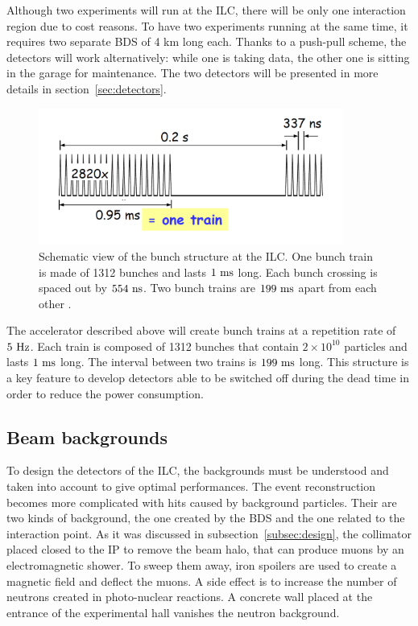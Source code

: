     Although two experiments will run at the \gls{ILC}, there will be only one interaction region due to cost reasons.
    To have two experiments running at the same time, it requires two separate \gls{BDS} of 4 km long each.
    Thanks to a push-pull scheme, the detectors will work alternatively: while one is taking data, the other one is sitting in the garage for maintenance.
    The two detectors will be presented in more details in section~\ref{sec:detectors}.
    
    \begin{figure}[!h]
      \centering
      \includegraphics[width = 10cm]{Pictures/ILC/bunch.png}
      \caption{Schematic view of the bunch structure at the ILC. One bunch train is made of 1312 bunches and lasts $1~\rm{ms}$ long. Each bunch crossing is spaced out by $554~\rm{ns}$. Two bunch trains are $199~\rm{ms}$ apart from each other \cite{Li2010}.}
      \label{fig:bunches}
    \end{figure}

    The accelerator described above will create bunch trains at a repetition rate of $5~\rm{Hz}$. 
    Each train is composed of 1312 bunches that contain $2\times 10^{10}$ particles and lasts $1~\rm{ms}$ long. 
    The interval between two trains is $199~\rm{ms}$ long. 
    This structure is a key feature to develop detectors able to be switched off during the dead time in order to reduce the power consumption.

    \subsection{Beam backgrounds}

    To design the detectors of the \gls{ILC}, the backgrounds must be understood and taken into account to give optimal performances.
    The event reconstruction becomes more complicated with hits caused by background particles.
    Their are two kinds of background, the one created by the \gls{BDS} and the one related to the interaction point.
    As it was discussed in subsection~\ref{subsec:design}, the collimator placed closed to the \gls{IP} to remove the beam halo, that can produce muons by an electromagnetic shower.
    To sweep them away, iron spoilers are used to create a magnetic field and deflect the muons.
    A side effect is to increase the number of neutrons created in photo-nuclear reactions.
    A concrete wall placed at the entrance of the experimental hall vanishes the neutron background.

